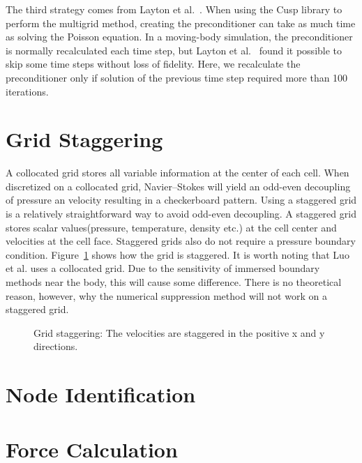\documentclass[onehalf,11pt]{beavtex}
\begin{document}
The third strategy comes from Layton et al.~\cite{layton2011cuibm}.
When using the Cusp library to perform the multigrid method, creating the preconditioner can take as much time as solving the Poisson equation.
In a moving-body simulation, the preconditioner is normally recalculated each time step, but Layton et al.~\cite{layton2011cuibm} found it possible to skip some time steps without loss of fidelity.
Here, we recalculate the preconditioner only if solution of the previous time step required more than 100 iterations.

\section{Grid Staggering}
\label{Grid Staggering}

A collocated grid stores all variable information at the center of each cell.
When discretized on a collocated grid, Navier--Stokes will yield an odd-even decoupling of pressure an velocity resulting in a checkerboard pattern. 
Using a staggered grid is a relatively straightforward way to avoid odd-even decoupling.
A staggered grid stores scalar values(pressure, temperature, density etc.) at the cell center and velocities at the cell face. 
Staggered grids also do not require a pressure boundary condition.
Figure~\ref{fig:stagger} shows how the grid is staggered.
It is worth noting that Luo et al.\cite{Luo:2012gx} uses a collocated grid.
Due to the sensitivity of immersed boundary methods near the body, this will cause some difference.
There is no theoretical reason, however, why the numerical suppression method will not work on a staggered grid.
\begin{figure}[htb]
	\centering
	
	\caption{Grid staggering: The velocities are staggered in the positive x and y directions.}
	\label{fig:stagger}
\end{figure}

\section{Node Identification}

\section{Force Calculation}
\label{Force Calculation}
\end{document}
